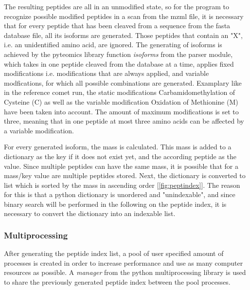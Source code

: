 \documentclass[11pt]{article}
\begin{document}
The resulting peptides are all in an unmodified state, so for the program to recognize possible modified peptides in a scan from the mzml file, it is necessary that for every peptide that has been cleaved from a sequence from the fasta database file, all its isoforms are generated. Those peptides that contain an "X", i.e. an unidentified amino acid, are ignored. The generating of isoforms is achieved by the pyteomics library function \textit{isoforms} from the parser module, which takes in one peptide cleaved from the database at a time, applies fixed modifications i.e. modifications that are always applied, and variable modfications, for which all possible combinations are generated. Examplary like in the reference comet run, the static modifications Carbamidomethylation of Cysteine (C) as well as the variable modification Oxidation of Methionine (M) have been taken into account. The amount of maximum modifications is set to three, meaning that in one peptide at most three amino acids can be affected by a variable modification.

For every generated isoform, the mass is calculated. This mass is added to a dictionary as the key if it does not exist yet, and the according peptide as the value. Since multiple peptides can have the same mass, it is possible that for a mass/key value are multiple peptides stored. Next, the dictionary is converted to list which is sorted by the mass in ascending order [\cref{fig:peptindex}]. The reason for this is that a python dictionary is unordered and "unindexable", and since binary search will be performed in the following on the peptide index, it is necessary to convert the dictionary into an indexable list.
 
\subsubsection{Multiprocessing}
After generating the peptide index list, a pool of user specified amount of processes is created in order to increase performance and use as many computer resources as possible. A \textit{manager} from the python multiprocessing library is used to share the previously generated peptide index between the pool processes. 
\end{document}
